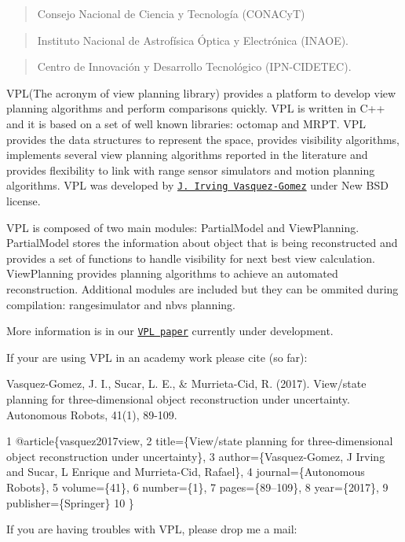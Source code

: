\begin{quote}
Consejo Nacional de Ciencia y Tecnología (C\+O\+N\+A\+CyT) \end{quote}


\begin{quote}
Instituto Nacional de Astrofísica Óptica y Electrónica (I\+N\+A\+OE). \end{quote}


\begin{quote}
Centro de Innovación y Desarrollo Tecnológico (I\+P\+N-\/\+C\+I\+D\+E\+T\+EC). \end{quote}


V\+P\+L(\+The acronym of view planning library) provides a platform to develop view planning algorithms and perform comparisons quickly. V\+PL is written in C++ and it is based on a set of well known libraries\+: octomap and M\+R\+PT. V\+PL provides the data structures to represent the space, provides visibility algorithms, implements several view planning algorithms reported in the literature and provides flexibility to link with range sensor simulators and motion planning algorithms. V\+PL was developed by \href{https://jivasquez.wordpress.com}{\tt J. Irving Vasquez-\/\+Gomez} under New B\+SD license.

V\+PL is composed of two main modules\+: Partial\+Model and View\+Planning. Partial\+Model stores the information about object that is being reconstructed and provides a set of functions to handle visibility for next best view calculation. View\+Planning provides planning algorithms to achieve an automated reconstruction. Additional modules are included but they can be ommited during compilation\+: rangesimulator and nbvs planning.



More information is in our \href{https://jivasquez.files.wordpress.com/2017/05/vas_vpl_towards.pdf}{\tt V\+PL paper} currently under development.

If your are using V\+PL in an academy work please cite (so far)\+:

Vasquez-\/\+Gomez, J. I., Sucar, L. E., \& Murrieta-\/\+Cid, R. (2017). View/state planning for three-\/dimensional object reconstruction under uncertainty. Autonomous Robots, 41(1), 89-\/109.


\begin{DoxyCode}
1 @article\{vasquez2017view,
2   title=\{View/state planning for three-dimensional object reconstruction under uncertainty\},
3   author=\{Vasquez-Gomez, J Irving and Sucar, L Enrique and Murrieta-Cid, Rafael\},
4   journal=\{Autonomous Robots\},
5   volume=\{41\},
6   number=\{1\},
7   pages=\{89--109\},
8   year=\{2017\},
9   publisher=\{Springer\}
10 \}
\end{DoxyCode}
 If you are having troubles with V\+PL, please drop me a mail\+: 


